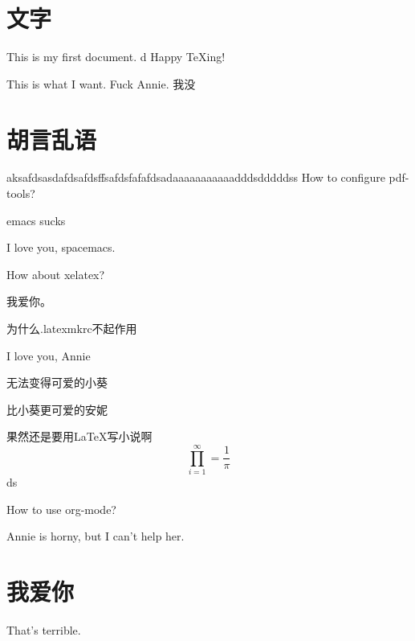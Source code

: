\documentclass[UTF8]{ctexart}
\begin{document}
\section{文字}
This is my first document.
d
Happy \TeX ing!


This is what I want.
Fuck Annie.
我没 

\section{胡言乱语}

aksafdsasdafdsafdsffsafdsfafafdsadaaaaaaaaaaadddsdddddss
How to configure pdf-tools?

emacs sucks

I love you, spacemacs.


How about xelatex?

我爱你。

为什么.latexmkrc不起作用

I love you, Annie

无法变得可爱的小葵

比小葵更可爱的安妮

果然还是要用\LaTeX 写小说啊 \\

\begin{equation}
  \prod_{i=1}^{\infty}=\frac{1}{\pi}
  \end{equation}
  ds

How to use org-mode?

Annie is horny, but I can't help her.






\section{我爱你}
That's terrible.
\end{document}
